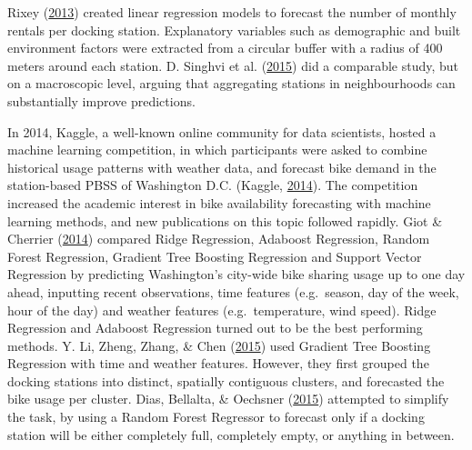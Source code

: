 \documentclass[12pt,oneside]{reedthesis}
\begin{document}
Rixey (\protect\hyperlink{ref-rixley2013}{2013}) created linear
regression models to forecast the number of monthly rentals per docking
station. Explanatory variables such as demographic and built environment
factors were extracted from a circular buffer with a radius of 400
meters around each station. D. Singhvi et al.
(\protect\hyperlink{ref-singhvi2015}{2015}) did a comparable study, but
on a macroscopic level, arguing that aggregating stations in
neighbourhoods can substantially improve predictions.

In 2014, Kaggle, a well-known online community for data scientists,
hosted a machine learning competition, in which participants were asked
to combine historical usage patterns with weather data, and forecast
bike demand in the station-based PBSS of Washington D.C. (Kaggle,
\protect\hyperlink{ref-kaggle}{2014}). The competition increased the
academic interest in bike availability forecasting with machine learning
methods, and new publications on this topic followed rapidly. Giot \&
Cherrier (\protect\hyperlink{ref-giot2014}{2014}) compared Ridge
Regression, Adaboost Regression, Random Forest Regression, Gradient Tree
Boosting Regression and Support Vector Regression by predicting
Washington's city-wide bike sharing usage up to one day ahead, inputting
recent observations, time features (e.g.~season, day of the week, hour
of the day) and weather features (e.g.~temperature, wind speed). Ridge
Regression and Adaboost Regression turned out to be the best performing
methods. Y. Li, Zheng, Zhang, \& Chen
(\protect\hyperlink{ref-li2015}{2015}) used Gradient Tree Boosting
Regression with time and weather features. However, they first grouped
the docking stations into distinct, spatially contiguous clusters, and
forecasted the bike usage per cluster. Dias, Bellalta, \& Oechsner
(\protect\hyperlink{ref-dias2015}{2015}) attempted to simplify the task,
by using a Random Forest Regressor to forecast only if a docking station
will be either completely full, completely empty, or anything in
between.
\end{document}
